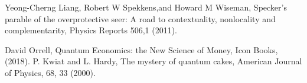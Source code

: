 \documentclass[12pt,onecolumn,preprintnumbers,amsmath,amssymbn,reprint,nofootinbib,superscriptaddress]{revtex4}    %
\begin{document}
\begin{thebibliography}{}
 Yeong-Cherng Liang, Robert W Spekkens,and Howard M Wiseman,  Specker’s parable of the overprotective seer: A road to contextuality, nonlocality and complementarity, Physics Reports 506,1 (2011).

David Orrell, Quantum Economics:  the New Science of Money, Icon Books, (2018).
 P. Kwiat and L. Hardy, The mystery of quantum cakes, American Journal of Physics, 68, 33 (2000).

\end{thebibliography}
\end{document}
